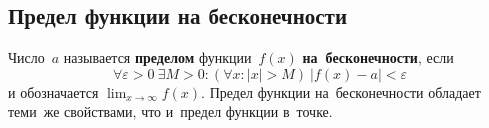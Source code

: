 \subsection{Предел функции на бесконечности}
Число~$a$ называется \textbf{пределом} функции~$f(x)$ \textbf{на~бесконечности}, если
\begin{equation*}
\forall \varepsilon > 0 \ \exists M > 0 \colon (\forall x \colon |x| > M) \ |f(x) - a| < \varepsilon
\end{equation*}
и обозначается $\displaystyle \lim_{x \to \infty} f(x)$.
Предел функции на~бесконечности обладает теми~же свойствами, что и~предел функции в~точке.